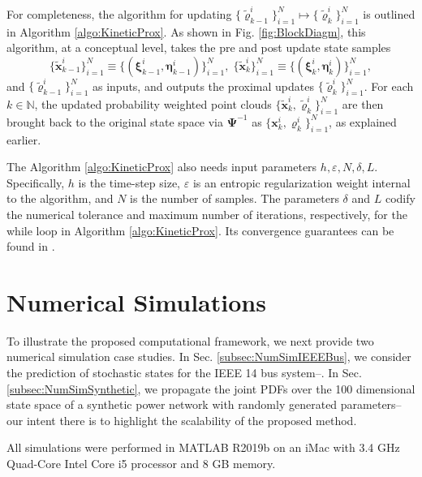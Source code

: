 \documentclass[10pt,twocolumn]{IEEEtran}
\newcommand{\red}{\color{red}}
\begin{document}
For completeness, the algorithm  for updating $\{\tilde{\varrho}_{k-1}^{i}\}_{i=1}^{N}\mapsto\{\tilde{\varrho}_{k}^{i}\}_{i=1}^{N}$ is outlined in Algorithm \ref{algo:KineticProx}. As shown in Fig. \ref{fig:BlockDiagm}, this algorithm, at a conceptual level, takes the pre and post update state samples 
\[\{\tilde{\bm{x}}_{k-1}^{i}\}_{i=1}^{N}\equiv\{\left(\bm{\xi}_{k-1}^{i},\bm{\eta}_{k-1}^{i}\right)\}_{i=1}^{N}, \; \{\tilde{\bm{x}}_{k}^{i}\}_{i=1}^{N}\equiv\{\left(\bm{\xi}_{k}^{i},\bm{\eta}_{k}^{i}\right)\}_{i=1}^{N},\]
and $\{\tilde{\varrho}_{k-1}^{i}\}_{i=1}^{N}$ as inputs, and outputs the proximal updates $\{\tilde{\varrho}_{k}^{i}\}_{i=1}^{N}$. For each $k\in\mathbb{N}$, the updated probability weighted point clouds $\{\tilde{\bm{x}}_{k}^{i},\tilde{\varrho}_{k}^{i}\}_{i=1}^{N}$ are then brought back to the original state space via $\bm{\Psi}^{-1}$ as $\{\bm{x}_{k}^{i},\varrho_{k}^{i}\}_{i=1}^{N}$, as explained earlier.


The Algorithm \ref{algo:KineticProx} also needs input parameters $h,\varepsilon,N,\delta,L$. Specifically, $h$ is the time-step size, $\varepsilon$ is an entropic regularization weight internal to the  algorithm, and $N$ is the number of samples. The parameters $\delta$ and $L$ codify the numerical tolerance and maximum number of iterations, respectively, for the while loop in Algorithm \ref{algo:KineticProx}. Its convergence guarantees can be found in \cite[Sec. III.C]{caluya2019TAC}.



\section{Numerical Simulations}\label{sec:NumericalSimulations}
To illustrate the proposed computational framework, we next provide two numerical simulation case studies. In Sec. \ref{subsec:NumSimIEEEBus}, we consider the prediction of stochastic states for the IEEE 14 bus system--{\red{our main objective being to highlight the interpretability and utility of the proposed method in power systems engineering}}. In Sec. \ref{subsec:NumSimSynthetic}, we propagate the joint PDFs over the 100 dimensional state space of a synthetic power network with randomly generated parameters--our intent there is to highlight the scalability of the proposed method. 

All simulations were performed in MATLAB R2019b on an iMac with 3.4 GHz Quad-Core Intel Core i5 processor and 8 GB memory. 
\end{document}
